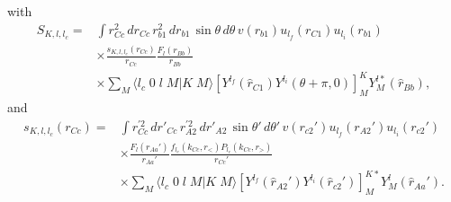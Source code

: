 with
\begin{equation}\label{eq127}
 \begin{split}
S_{K,l,l_c}=&\int r_{Cc}^2 \, d r_{Cc}\,r_{b1}^2\, d r_{b1} \,\sin\theta\, d\theta \, v(r_{b1}) u_{l_f}(r_{C1})u_{l_i}(r_{b1})\\
& \times \frac{s_{K,l,l_c}(r_{Cc})}{r_{Cc}}\frac{F_l(r_{Bb})}{r_{Bb}}\\
&\times\sum_M \langle l_c \;0\;l\;M|K\;M\rangle \left[ Y ^{l_f} (\hat r_{C1}) Y ^{l_i} (\theta+\pi,0) \right] _{M}^{K}
 Y^{l*}_M (\hat r_{Bb}),
 \end{split}
\end{equation}
and
\begin{equation}\label{eq128}
 \begin{split}
s_{K,l,l_c}(r_{Cc})=&\int r_{Cc}^{'2} \, d r'_{Cc}\,r_{A2}^{'2}\, d r'_{A2} \,\sin\theta'\, d\theta' \, v(r_{c2}') u_{l_f}(r_{A2}')u_{l_i}(r_{c2}')  \\
& \times \frac{F_l(r_{Aa}')}{r_{Aa}'}\frac{f_{l_c}(k_{Cc},r_<)P_{l_c}(k_{Cc},r_>)}{r_{Cc}'}\\
&\times\sum_M \langle l_c \;0\;l\;M|K\;M\rangle \left[ Y ^{l_f} (\hat r_{A2}') Y ^{l_i} (\hat r_{c2}') \right] _{M}^{K*}
 Y^{l}_M (\hat r_{Aa}').
 \end{split}
\end{equation}
